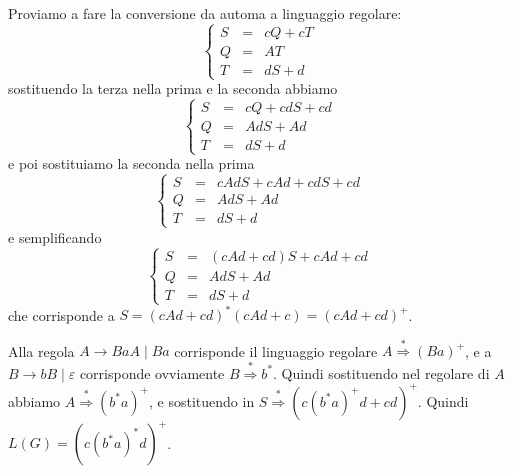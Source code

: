 \documentclass[12pt]{report}
\theoremstyle{definition}
\begin{document}
\begin{center}	%
\end{center}

Proviamo a fare la conversione da automa a linguaggio regolare:
$$ \left \{ \begin{array}{ccc} S & = & c Q + c T \\ Q & = & A T \\ T & = & d S + d \end{array} \right .$$
sostituendo la terza nella prima e la seconda abbiamo
$$ \left \{ \begin{array}{ccc} S & = & c Q + c d S + c d \\ Q & = & A d S + A d \\ T & = & d S + d \end{array} \right .$$
e poi sostituiamo la seconda nella prima
$$ \left \{ \begin{array}{ccc} S & = & c A d S + c A d + c d S + c d \\ Q & = & A d S + A d \\ T & = & d S + d \end{array} \right .$$
e semplificando
$$ \left \{ \begin{array}{ccc} S & = & (c A d + c d)S + c A d + c d \\ Q & = & A d S + A d \\ T & = & d S + d \end{array} \right .$$
che corrisponde a $S = (cAd + cd)^* (cAd + c) = (cAd + cd)^+$.

Alla regola $A \rightarrow B a A \mid B a$ corrisponde il linguaggio regolare $A \overset{*}{\Rightarrow} (B a)^+$, e a $B \rightarrow b B \mid \varepsilon$ corrisponde ovviamente $B \overset{*}{\Rightarrow} b^*$.
Quindi sostituendo nel regolare di $A$ abbiamo $A \overset{*}{\Rightarrow} (b^* a)^+$, e sostituendo in $S \overset{*}{\Rightarrow} (c (b^* a)^+ d + cd)^+$.
Quindi $L(G) = (c (b^* a)^* d)^+$.
\end{document}
